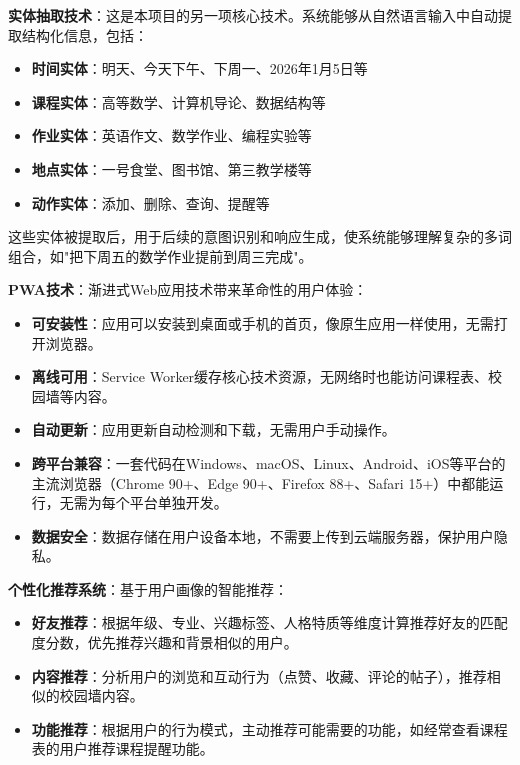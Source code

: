 \documentclass[12pt,a4paper]{article}
\begin{document}
\textbf{实体抽取技术}：这是本项目的另一项核心技术。系统能够从自然语言输入中自动提取结构化信息，包括：

\begin{itemize}
    \item \textbf{时间实体}：明天、今天下午、下周一、2026年1月5日等
    \item \textbf{课程实体}：高等数学、计算机导论、数据结构等
    \item \textbf{作业实体}：英语作文、数学作业、编程实验等
    \item \textbf{地点实体}：一号食堂、图书馆、第三教学楼等
    \item \textbf{动作实体}：添加、删除、查询、提醒等
\end{itemize}

这些实体被提取后，用于后续的意图识别和响应生成，使系统能够理解复杂的多词组合，如"把下周五的数学作业提前到周三完成"。

\textbf{PWA技术}：渐进式Web应用技术带来革命性的用户体验：

\begin{itemize}
    \item \textbf{可安装性}：应用可以安装到桌面或手机的首页，像原生应用一样使用，无需打开浏览器。
    \item \textbf{离线可用}：Service Worker缓存核心技术资源，无网络时也能访问课程表、校园墙等内容。
    \item \textbf{自动更新}：应用更新自动检测和下载，无需用户手动操作。
    \item \textbf{跨平台兼容}：一套代码在Windows、macOS、Linux、Android、iOS等平台的主流浏览器（Chrome 90+、Edge 90+、Firefox 88+、Safari 15+）中都能运行，无需为每个平台单独开发。
    \item \textbf{数据安全}：数据存储在用户设备本地，不需要上传到云端服务器，保护用户隐私。
\end{itemize}

\textbf{个性化推荐系统}：基于用户画像的智能推荐：

\begin{itemize}
    \item \textbf{好友推荐}：根据年级、专业、兴趣标签、人格特质等维度计算推荐好友的匹配度分数，优先推荐兴趣和背景相似的用户。
    \item \textbf{内容推荐}：分析用户的浏览和互动行为（点赞、收藏、评论的帖子），推荐相似的校园墙内容。
    \item \textbf{功能推荐}：根据用户的行为模式，主动推荐可能需要的功能，如经常查看课程表的用户推荐课程提醒功能。
\end{itemize}
\end{document}
